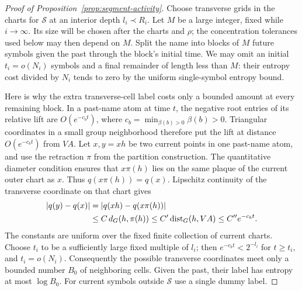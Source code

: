 \begin{proof}[Proof of Proposition~\ref{prop:segment-activity}]
Choose transverse grids in the charts for $\mathcal S$ at an interior
depth $l_i\prec R_i$.  Let $M$ be a large integer, fixed while
$i\to\infty$.  Its size will be chosen after the charts and $\rho$;
the concentration tolerances used below may then depend on $M$.
Split the name into blocks of $M$ future symbols given the
past through the block's initial time.  We may omit an initial
$t_i=o(N_i)$ symbols and a final remainder of length less than $M$:
their entropy cost divided by $N_i$ tends to zero by the uniform
single-symbol entropy bound.

Here is why the extra transverse-cell label costs only a bounded amount
at every remaining block.  In a past-name atom at time $t$, the negative
root entries of its relative lift are $O(e^{-c_b t})$, where
$c_b=\min_{\beta(b)>0}\beta(b)>0$.  Triangular coordinates in a small
group neighborhood therefore put the lift at distance
$O(e^{-c_b t})$ from $VA$.  Let $x,y=xh$ be two current points in one
past-name atom, and use the retraction $\pi$ from the partition
construction.  The quantitative diameter condition ensures that
$x\pi(h)$ lies on the same plaque of the current outer chart as $x$.
Thus $q(x\pi(h))=q(x)$.  Lipschitz continuity of the transverse
coordinate on that chart gives
\[
 \begin{aligned}
 |q(y)-q(x)|
 &=|q(xh)-q(x\pi(h))|\\
 &\leq C\,d_G(h,\pi(h))
 \leq C'\operatorname{dist}_G(h,VA)
 \leq C''e^{-c_b t}.
 \end{aligned}
\]
The constants are uniform over the fixed finite collection of current
charts.  Choose
$t_i$ to be a sufficiently large fixed multiple of $l_i$; then
$e^{-c_b t}<2^{-l_i}$ for $t\geq t_i$, and $t_i=o(N_i)$.
Consequently the possible transverse coordinates meet only a bounded
number $B_0$ of neighboring cells.  Given the past, their label has
entropy at most $\log B_0$.  For current symbols outside $\mathcal S$
use a single dummy label.


\end{proof}
